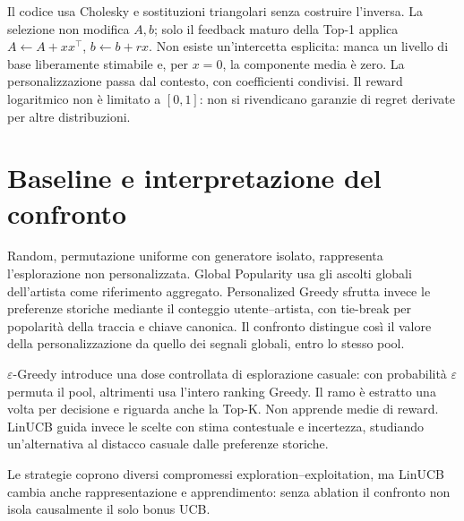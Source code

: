 Il codice usa Cholesky e sostituzioni triangolari senza costruire l'inversa. La selezione non modifica $A,b$; solo il feedback maturo della Top-1 applica $A\leftarrow A+xx^\top$, $b\leftarrow b+rx$. Non esiste un'intercetta esplicita: manca un livello di base liberamente stimabile e, per $x=0$, la componente media è zero. La personalizzazione passa dal contesto, con coefficienti condivisi. Il reward logaritmico non è limitato a $[0,1]$: non si rivendicano garanzie di regret derivate per altre distribuzioni.

\section{Baseline e interpretazione del confronto}
Random, permutazione uniforme con generatore isolato, rappresenta l'esplorazione non personalizzata. Global Popularity usa gli ascolti globali dell'artista come riferimento aggregato. Personalized Greedy sfrutta invece le preferenze storiche mediante il conteggio utente--artista, con tie-break per popolarità della traccia e chiave canonica. Il confronto distingue così il valore della personalizzazione da quello dei segnali globali, entro lo stesso pool.

$\varepsilon$-Greedy introduce una dose controllata di esplorazione casuale: con probabilità $\varepsilon$ permuta il pool, altrimenti usa l'intero ranking Greedy. Il ramo è estratto una volta per decisione e riguarda anche la Top-K. Non apprende medie di reward. LinUCB guida invece le scelte con stima contestuale e incertezza, studiando un'alternativa al distacco casuale dalle preferenze storiche.

Le strategie coprono diversi compromessi exploration--exploitation, ma LinUCB cambia anche rappresentazione e apprendimento: senza ablation il confronto non isola causalmente il solo bonus UCB.

